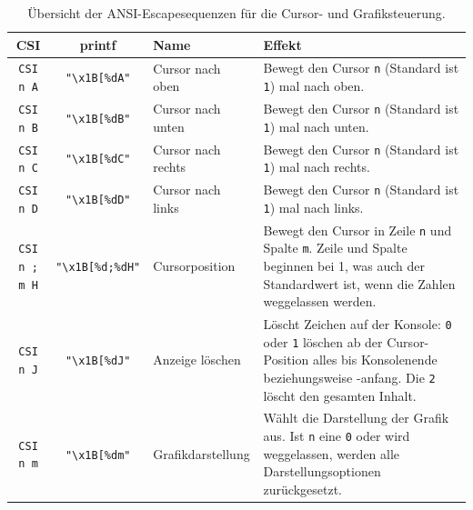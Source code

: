 \begin{table}[h]
  \begin{tabular}{cclp{8cm}}
    \toprule
    \textbf{CSI} & \textbf{printf} & \textbf{Name} & \textbf{Effekt} \\
    \midrule
    \texttt{CSI n A}        & \texttt{"\textbackslash x1B[\%dA"}         & Cursor nach oben & 
        Bewegt den Cursor \texttt{n} (Standard ist \texttt{1}) mal nach oben. \\ 
    \texttt{CSI n B}        & \texttt{"\textbackslash x1B[\%dB"}         & Cursor nach unten & 
        Bewegt den Cursor \texttt{n} (Standard ist \texttt{1}) mal nach unten. \\ 
    \texttt{CSI n C}        & \texttt{"\textbackslash x1B[\%dC"}         & Cursor nach rechts & 
        Bewegt den Cursor \texttt{n} (Standard ist \texttt{1}) mal nach rechts. \\ 
    \texttt{CSI n D}        & \texttt{"\textbackslash x1B[\%dD"}         & Cursor nach links & 
        Bewegt den Cursor \texttt{n} (Standard ist \texttt{1}) mal nach links. \\ 
    \texttt{CSI n ; m H}    & \texttt{"\textbackslash x1B[\%d;\%dH"}     & Cursorposition & 
        Bewegt den Cursor in Zeile \texttt{n} und Spalte \texttt{m}. Zeile und Spalte beginnen bei 1, was auch der Standardwert ist, wenn die Zahlen weggelassen werden. \\
    \texttt{CSI n J}        & \texttt{"\textbackslash x1B[\%dJ"}        & Anzeige löschen &
        Löscht Zeichen auf der Konsole: \texttt{0} oder \texttt{1} löschen ab der Cursor-Position alles bis Konsolenende beziehungsweise -anfang. Die \texttt{2} löscht den gesamten Inhalt. \\ 
    \midrule
    \texttt{CSI n m}        & \texttt{"\textbackslash x1B[\%dm"}        & Grafikdarstellung &
        Wählt die Darstellung der Grafik aus. Ist \texttt{n} eine \texttt{0} oder wird weggelassen, werden alle Darstellungsoptionen zurückgesetzt. \\
    \bottomrule
  \end{tabular}
  \caption{Übersicht der ANSI-Escapesequenzen für die Cursor- und Grafiksteuerung.}
  \label{tab:referenz::ansi-esc}
\end{table}

